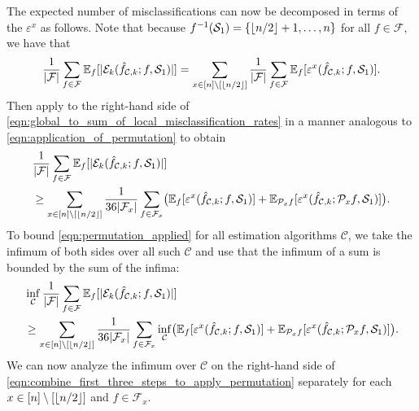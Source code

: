 \documentclass[11pt]{article}
\newcommand{\mc}[1]{\mathcal{#1}}
\newcommand{\mcC}{\mathcal{C}}
\newcommand{\mcE}{\mathcal{E}}
\newcommand{\mcF}{\mathcal{F}}
\newcommand{\mcP}{\mathcal{P}}
\newcommand{\mcS}{\mathcal{S}}
\newcommand{\mbbE}{\mathbb{E}}
\DeclarePairedDelimiter\floor{\lfloor}{\rfloor}
\theoremstyle{definition}
\theoremstyle{definition}
\begin{document}
The expected number of misclassifications can now be decomposed in terms of the $\varepsilon^x$ as follows.
Note that because $f^{-1}(\mcS_1)=\{\floor{n/2}+1,\ldots,n\}$ for all $f\in\mcF$, we have that
\begin{equation}
	\label{eqn:global_to_sum_of_local_misclassification_rates}
	\begin{split}
		\frac{1}{|\mcF|}
		\sum_{f\in\mcF}
		\mbbE_{f}[
			|\mcE_k(\hat{f}_{\mcC,k};f,\mcS_1)|
		]
		=
		\sum_{x\in[n]\setminus[\floor{n/2}]}
		\frac{1}{|\mcF|}
		\sum_{f\in\mcF}
		\mbbE_{f}[
			\varepsilon^x(\hat{f}_{\mcC,k};f,\mcS_1)
		]
		.
	\end{split}
\end{equation}
Then apply  to the right-hand side of \eqref{eqn:global_to_sum_of_local_misclassification_rates} in a manner analogous to \eqref{eqn:application_of_permutation} to obtain
\begin{equation}
	\label{eqn:permutation_applied}
	\begin{split}
		 &
		\frac{1}{|\mcF|}
		\sum_{f\in\mcF}
		\mbbE_{f}[
			|\mcE_k(\hat{f}_{\mcC,k};f,\mcS_1)|
		]
		\\
		 &
		\geq
		\sum_{x\in[n]\setminus[\floor{n/2}]}
		\frac{1}{36|\mcF_x|}
		\sum_{f\in\mcF_x}
		\bigl(
		\mbbE_{f}[
				\varepsilon^x(\hat{f}_{\mcC,k};f,\mcS_1)
			]
		+
		\mbbE_{\mcP_xf}[
				\varepsilon^x(\hat{f}_{\mcC,k};\mcP_x f,\mcS_1)
			]
		\bigr)
		.
	\end{split}
\end{equation}
To bound \eqref{eqn:permutation_applied} for all estimation algorithms $\mc{C}$, we take the infimum of both sides over all such $\mc{C}$ and use that the infimum of a sum is bounded by the sum of the infima:
\begin{align}
	\label{eqn:combine_first_three_steps_to_apply_permutation}
	 &
	\inf_{\mcC}
	\frac{1}{|\mcF|}
	\sum_{f\in\mcF}
	\mbbE_{f}[
		|\mcE_k(\hat{f}_{\mcC,k};f,\mcS_1)|
	]
	\\
	 &
	\geq
	\sum_{x\in[n]\setminus[\floor{n/2}]}
	\frac{1}{36|\mcF_x|}
	\sum_{f\in\mcF_x}
	\inf_{\mcC}
	\bigl(
	\mbbE_{f}[
			\varepsilon^x(\hat{f}_{\mcC,k};f,\mcS_1)
		]
	+
	\mbbE_{\mcP_xf}[
			\varepsilon^x(\hat{f}_{\mcC,k};\mcP_x f,\mcS_1)
		]
	\bigr)
	.
	\nonumber
\end{align}
We can now analyze the infimum over $\mcC$ on the right-hand side of \eqref{eqn:combine_first_three_steps_to_apply_permutation} separately for each $x\in[n]\setminus[\floor{n/2}]$ and $f\in\mcF_x$.
\end{document}

